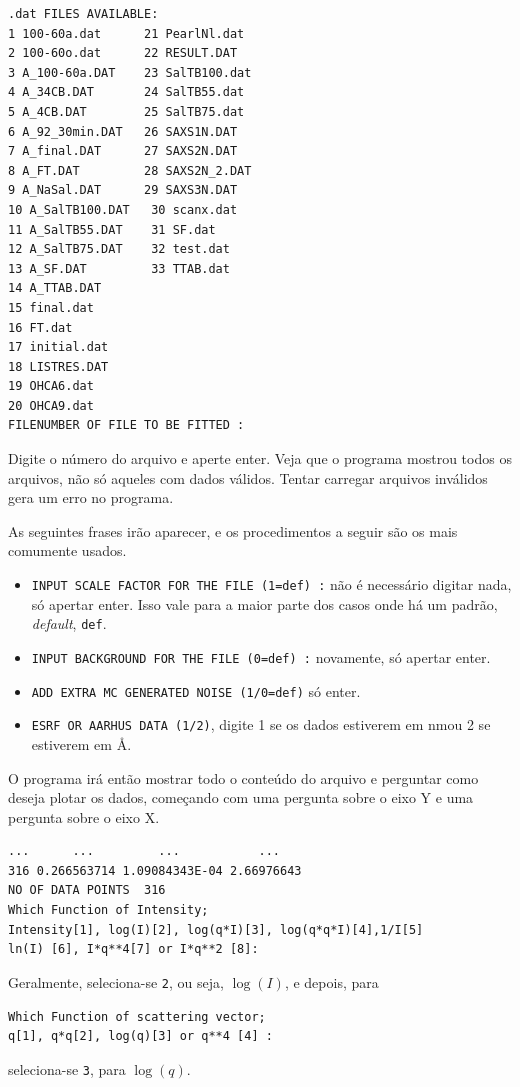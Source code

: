 \begin{apendicesenv}
\begin{verbatim}
.dat FILES AVAILABLE:
1 100-60a.dat      21 PearlNl.dat
2 100-60o.dat      22 RESULT.DAT
3 A_100-60a.DAT    23 SalTB100.dat
4 A_34CB.DAT       24 SalTB55.dat
5 A_4CB.DAT        25 SalTB75.dat
6 A_92_30min.DAT   26 SAXS1N.DAT
7 A_final.DAT      27 SAXS2N.DAT
8 A_FT.DAT         28 SAXS2N_2.DAT
9 A_NaSal.DAT      29 SAXS3N.DAT
10 A_SalTB100.DAT   30 scanx.dat
11 A_SalTB55.DAT    31 SF.dat
12 A_SalTB75.DAT    32 test.dat
13 A_SF.DAT         33 TTAB.dat
14 A_TTAB.DAT
15 final.dat
16 FT.dat
17 initial.dat
18 LISTRES.DAT
19 OHCA6.dat
20 OHCA9.dat
FILENUMBER OF FILE TO BE FITTED :
\end{verbatim}

Digite o número do arquivo e aperte enter. Veja que o programa mostrou todos os arquivos, não só aqueles com dados válidos. Tentar carregar arquivos inválidos gera um erro no programa.

As seguintes frases irão aparecer, e os procedimentos a seguir são os mais comumente usados.

\begin{itemize}
	\item \texttt{INPUT SCALE FACTOR FOR THE FILE (1=def) :} não é necessário digitar nada, só apertar enter. Isso vale para a maior parte dos casos onde há um padrão, \emph{default}, \texttt{def}.
	\item \texttt{INPUT BACKGROUND FOR THE FILE (0=def) :} novamente, só apertar enter.
	\item \texttt{ADD EXTRA MC GENERATED NOISE (1/0=def)} só enter.
	\item \texttt{ESRF OR AARHUS DATA (1/2)}, digite 1 se os dados estiverem em nm\menosUm ou 2 se estiverem em \AA\menosUm.
\end{itemize}

O programa irá então mostrar todo o conteúdo do arquivo e perguntar como deseja plotar os dados, começando com uma pergunta sobre o eixo Y e uma pergunta sobre o eixo X.

\begin{verbatim}
...      ...         ...           ...
316 0.266563714 1.09084343E-04 2.66976643
NO OF DATA POINTS  316
Which Function of Intensity;
Intensity[1], log(I)[2], log(q*I)[3], log(q*q*I)[4],1/I[5]
ln(I) [6], I*q**4[7] or I*q**2 [8]:
\end{verbatim}

Geralmente, seleciona-se \texttt{2}, ou seja, \(\log(I)\), e depois, para 
\begin{verbatim}Which Function of scattering vector;
q[1], q*q[2], log(q)[3] or q**4 [4] :\end{verbatim} seleciona-se \texttt{3}, para \(\log(q)\).


\end{apendicesenv}
